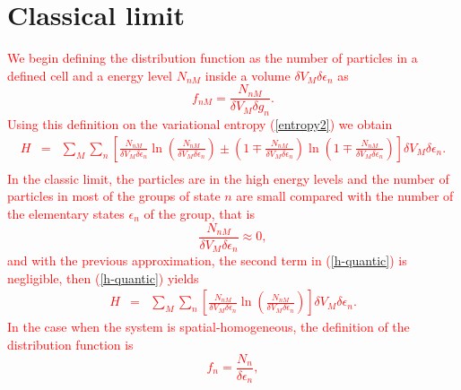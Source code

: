 \documentclass{article}
\begin{document}
\section{Classical limit}
\textcolor{red}{%
We begin defining the distribution function as the number of particles in a defined cell and a energy level $N_{nM}$ inside a volume $\delta V_M \delta \epsilon_n$ as
\begin{equation}
    f_{nM}=\frac{N_{nM}}{\delta V_M \delta g_{n} }.
\end{equation}
Using this definition on the variational entropy (\ref{entropy2}) we obtain
\begin{eqnarray}
    H&=& \sum_M \sum_n
    \left[  
           \frac{N_{nM}}{\delta V_M \delta \epsilon_{n}} \ln 
           \left( 
                  \frac{N_{nM}}{\delta V_M \delta \epsilon_{n}}
           \right)\pm 
           \left(  
                  1\mp \frac{N_{nM}}{\delta V_M \delta \epsilon_{n}}
           \right) \ln 
           \left(  
                   1\mp \frac{N_{nM}}{\delta V_M \delta \epsilon_{n}}
           \right)
    \right]\delta V_M \delta \epsilon_{n}. \nonumber \\
    \label{h-quantic} 
\end{eqnarray}
In the classic limit, the particles are in the high energy levels and the number of particles  in most of the groups of state $n$ are small compared with the number of the elementary states $\epsilon_n$ of the group, that is
\begin{equation}
    \frac{N_{nM}}{\delta V_M \delta \epsilon_{n} } \approx 0,
\end{equation}
and with the previous approximation, the second term in (\ref{h-quantic}) is negligible, then (\ref{h-quantic}) yields
\begin{eqnarray}
    H&=& \sum_M \sum_n
    \left[  
           \frac{N_{nM}}{\delta V_M \delta \epsilon_{n}} \ln 
           \left( 
                  \frac{N_{nM}}{\delta V_M \delta \epsilon_{n}}
           \right)
    \right]\delta V_M \delta \epsilon_{n}. \label{h-quantic2}
\end{eqnarray}
In the case when the system is spatial-homogeneous, the definition of the distribution function is 
\begin{equation}
    f_{n}=\frac{N_{n}}{ \delta \epsilon_{n} },
\end{equation}
}
\end{document}
